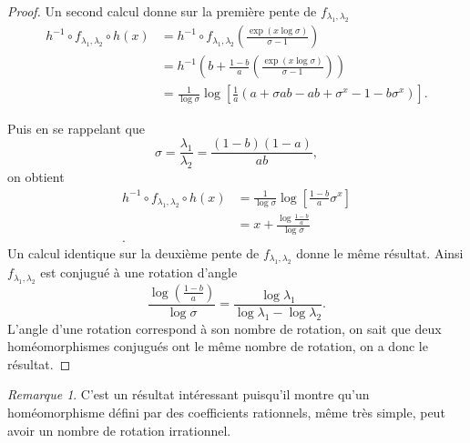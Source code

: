 \documentclass[12pt]{article}
\theoremstyle{remark}
\newtheorem*{remark}{Remarque}
\begin{document}
\begin{proof}
        Un second calcul donne sur la première pente de $f_{\lambda_1, \lambda_2}$ 
        \begin{align*}
                h^{-1}\circ f_{\lambda_1, \lambda_2} \circ h (x) &= h^{-1} \circ f_{\lambda_1, \lambda_2} (\frac{\exp(x\log\sigma)}{\sigma-1})\\ 
                                                                 &= h^{-1}(b+\frac{1-b}{a}(\frac{\exp(x\log\sigma)}{\sigma-1})) \\
                                                                 &= \frac{1}{\log\sigma}\log[\frac{1}{a}(a+\sigma ab - ab + \sigma^{x} - 1-b\sigma^{x})]
        .\end{align*}

        Puis en se rappelant que \[
                \sigma = \frac{\lambda_1}{\lambda_2} = \frac{(1-b)(1-a)}{ab}
        ,\] on obtient
        \begin{align*}
                h^{-1}\circ f_{\lambda_1, \lambda_2} \circ h (x) &= \frac{1}{\log\sigma}\log[\frac{1-b}{a}\sigma^{x}] \\
                                                                 &= x + \frac{\log\frac{1-b}{a}}{\log\sigma} \\
        .\end{align*}
        Un calcul identique sur la deuxième pente de $f_{\lambda_1, \lambda_2}$ donne le même résultat. Ainsi $f_{\lambda_1, \lambda_2}$ est conjugué à une rotation d'angle \[
        \frac{\log(\frac{1-b}{a})}{\log\sigma} = \frac{\log\lambda_1} {\log\lambda_1 -\log\lambda_2}
        .\] L'angle d'une rotation correspond à son nombre de rotation, on sait que deux homéomorphismes conjugués ont le même nombre de rotation, on a donc le résultat.
\end{proof}

        \begin{remark}
                C'est un résultat intéressant puisqu'il montre qu'un homéomorphisme défini par des coefficients rationnels, même très simple, peut avoir un nombre de rotation irrationnel.
        \end{remark}
\end{document}
